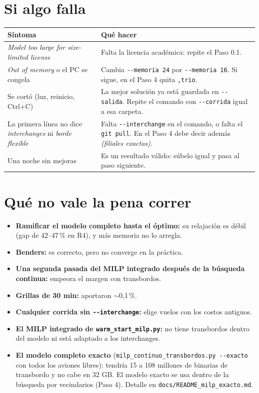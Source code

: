 \documentclass[11pt,a4paper]{article}
\begin{document}
\section{Si algo falla}

\begin{table}[h]
\centering
\small
\begin{tabularx}{\textwidth}{lX}
\toprule
Síntoma & Qué hacer \\
\midrule
\textit{Model too large for size-limited license} & Falta la licencia académica: repite el Paso 0.1. \\
\textit{Out of memory} o el PC se congela & Cambia \texttt{-{}-memoria 24} por \texttt{-{}-memoria 16}. Si sigue, en el Paso 4 quita \texttt{,trio}. \\
Se cortó (luz, reinicio, Ctrl+C) & La mejor solución ya está guardada en \texttt{-{}-salida}. Repite el comando con \texttt{-{}-corrida} igual a esa carpeta. \\
La primera línea no dice \textit{interchanges} ni \textit{borde flexible} & Falta \texttt{-{}-interchange} en el comando, o falta el \texttt{git pull}. En el Paso 4 debe decir además \textit{(filiales exactas)}. \\
Una noche sin mejoras & Es un resultado válido: súbelo igual y pasa al paso siguiente. \\
\bottomrule
\end{tabularx}
\end{table}

\section{Qué no vale la pena correr}

\begin{itemize}
  \item \textbf{Ramificar el modelo completo hasta el óptimo:} su relajación es débil (gap de 42--47\,\% en R4), y más memoria no lo arregla.
  \item \textbf{Benders:} es correcto, pero no converge en la práctica.
  \item \textbf{Una segunda pasada del MILP integrado después de la búsqueda continua:} empeora el margen con transbordos.
  \item \textbf{Grillas de 30 min:} aportaron $\sim$0,1\,\%.
  \item \textbf{Cualquier corrida sin \texttt{-{}-interchange}:} elige vuelos con los costos antiguos.
  \item \textbf{El MILP integrado de \texttt{warm\_start\_milp.py}:} no tiene transbordos dentro del modelo ni está adaptado a los interchanges.
  \item \textbf{El modelo completo exacto} (\texttt{milp\_continuo\_transbordos.py -{}-exacto} con todos los aviones libres): tendría 15 a 108 millones de binarias de transbordo y no cabe en 32 GB. El modelo exacto se usa dentro de la búsqueda por vecindarios (Paso 4). Detalle en \texttt{docs/README\_milp\_exacto.md}.
\end{itemize}
\end{document}
